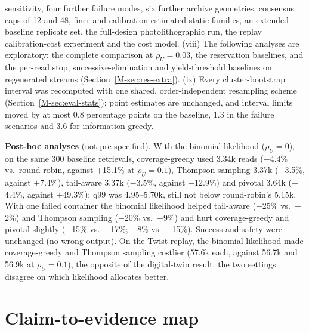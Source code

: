 \documentclass[conference,onecolumn,11pt]{IEEEtran}
\begin{document}
sensitivity, four further failure modes, six further archive geometries, consensus caps of 12 and 48,
finer and calibration-estimated static families, an extended baseline replicate set, the full-design
photolithographic run, the replay calibration-cost experiment and the cost model.  (viii) The following analyses
are exploratory: the complete comparison at $\rho_U{=}0.03$, the reservation
baselines, and the per-read stop, successive-elimination and yield-threshold baselines on regenerated
streams (Section~\ref{M-sec:res-extra}).  (ix) Every cluster-bootstrap interval was
recomputed with one shared, order-independent resampling scheme (Section~\ref{M-sec:eval-stats}); point
estimates are unchanged, and interval limits moved by at most 0.8 percentage points on the baseline,
1.3 in the failure scenarios and 3.6 for information-greedy.

\textbf{Post-hoc analyses} (not pre-specified).  With the binomial likelihood ($\rho_U{=}0$), on the same
300 baseline retrievals, coverage-greedy used 3.34k reads ($-$4.4\% vs.\ round-robin, against $+$15.1\%
at $\rho_U{=}0.1$), Thompson sampling 3.37k ($-$3.5\%, against $+$7.4\%), tail-aware 3.37k ($-$3.5\%,
against $+$12.9\%) and pivotal 3.64k ($+$4.4\%, against $+$49.3\%); q99 was 4.95--5.70k, still not below
round-robin's 5.15k.  With one failed container the binomial likelihood helped tail-aware ($-$25\% vs.\
$+$2\%) and Thompson sampling ($-$20\% vs.\ $-$9\%) and hurt coverage-greedy and pivotal slightly
($-$15\% vs.\ $-$17\%; $-$8\% vs.\ $-$15\%).  Success and safety were unchanged (no wrong output).  On the
Twist replay, the binomial likelihood made coverage-greedy and Thompson sampling costlier (57.6k each,
against 56.7k and 56.9k at $\rho_U{=}0.1$), the opposite of the digital-twin result: the two settings
disagree on which likelihood allocates better.

\section{Claim-to-evidence map}\label{supp:evidence}




\end{document}
